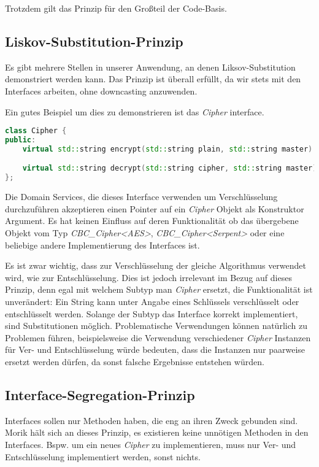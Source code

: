 Trotzdem gilt das Prinzip für den Großteil der Code-Basis.

\subsection{Liskov-Substitution-Prinzip}

Es gibt mehrere Stellen in unserer Anwendung, an denen Liksov-Substitution demonstriert werden kann. Das Prinzip ist überall erfüllt, da wir stets mit den Interfaces arbeiten, ohne downcasting anzuwenden.

Ein gutes Beispiel um dies zu demonstrieren ist das \textit{Cipher} interface.

\begin{lstlisting}[language=C++]
class Cipher {
public:
    virtual std::string encrypt(std::string plain, std::string master) const = 0;

    virtual std::string decrypt(std::string cipher, std::string master) const = 0;
};
\end{lstlisting}

Die Domain Services, die dieses Interface verwenden um Verschlüsselung durchzuführen akzeptieren einen Pointer auf ein \textit{Cipher} Objekt als Konstruktor Argument. Es hat keinen Einfluss auf deren Funktionalität ob das übergebene Objekt vom Typ \textit{CBC\_Cipher<AES>}, \textit{CBC\_Cipher<Serpent>} oder eine beliebige andere Implementierung des Interfaces ist.

Es ist zwar wichtig, dass zur Verschlüsselung der gleiche Algorithmus verwendet wird, wie zur Entschlüsselung. Dies ist jedoch irrelevant im Bezug auf dieses Prinzip, denn egal mit welchem Subtyp man \textit{Cipher} ersetzt, die Funktionalität ist unverändert: Ein String kann unter Angabe eines Schlüssels verschlüsselt oder entschlüsselt werden. Solange der Subtyp das Interface korrekt implementiert, sind Substitutionen möglich.
Problematische Verwendungen können natürlich zu Problemen führen, beispielsweise die Verwendung verschiedener \textit{Cipher} Instanzen für Ver- und Entschlüsselung würde bedeuten, dass die Instanzen nur paarweise ersetzt werden dürfen, da sonst falsche Ergebnisse entstehen würden.

\subsection{Interface-Segregation-Prinzip}

Interfaces sollen nur Methoden haben, die eng an ihren Zweck gebunden sind. Morik hält sich an dieses Prinzip, es existieren keine unnötigen Methoden in den Interfaces. Bspw. um ein neues \textit{Cipher} zu implementieren, muss nur Ver- und Entschlüsselung implementiert werden, sonst nichts.

